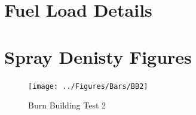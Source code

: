\documentclass[12pt,oneside]{book}
\begin{document}





\clearpage



\appendix

\chapter{Fuel Load Details}
\label{app:fuel_loads}


\chapter{Spray Denisty Figures}
\label{app:spray_density}

\begin{figure}[!ht]
	\texttt{[image: ../Figures/Bars/BB2]}
	\caption{Burn Building Test 2}
	\label{fig:Burn_Building_Test_2}
\end{figure}
\end{document}
